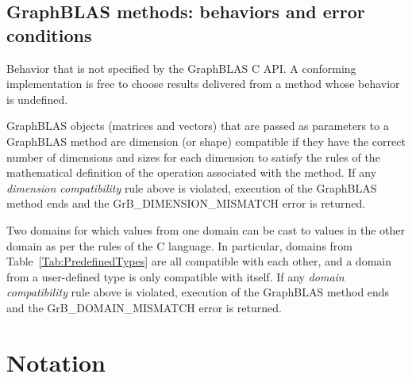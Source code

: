 
\subsection{GraphBLAS methods: behaviors and error conditions}
\glossBegin
{} Behavior that is not specified by the GraphBLAS C API.
A conforming implementation is free to choose results delivered from a method
whose behavior is undefined. 

 GraphBLAS objects (matrices and vectors) that are
passed as parameters to a GraphBLAS method are dimension (or shape) compatible if
they have the correct number of dimensions and sizes for each dimension to satisfy 
the rules of the mathematical definition of the operation associated with the method. 
If any \emph{dimension compatibility} rule above is violated, execution of the GraphBLAS 
method ends and the {\sf GrB\_DIMENSION\_MISMATCH} error is returned.

 Two domains for which values from one domain can be 
cast to values in the other domain as per the rules of the C language. In particular, 
domains from Table~\ref{Tab:PredefinedTypes} 
are all compatible with each other, and a domain from a user-defined type is only 
compatible with itself. If any \emph{domain compatibility} rule above is 
violated, execution of the GraphBLAS method ends and the {\sf GrB\_DOMAIN\_MISMATCH} 
error is returned.
\glossEnd

\vfill



\section{Notation}

